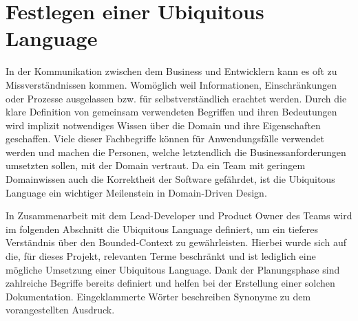 \section{Festlegen einer Ubiquitous Language}

In der Kommunikation zwischen dem Business und Entwicklern kann es oft zu Missverständnissen kommen. Womöglich weil Informationen, Einschränkungen oder Prozesse ausgelassen bzw. für selbstverständlich erachtet werden. Durch die klare Definition von gemeinsam verwendeten Begriffen und ihren Bedeutungen wird implizit notwendiges Wissen über die Domain und ihre Eigenschaften geschaffen. Viele dieser Fachbegriffe können für Anwendungsfälle verwendet werden und machen die Personen, welche letztendlich die Businessanforderungen umsetzten sollen, mit der Domain vertraut. Da ein Team mit geringem Domainwissen auch die Korrektheit der Software gefährdet, ist die Ubiquitous Language ein wichtiger Meilenstein in Domain-Driven Design. \cite[S. 335ff.]{Evans.2011}

In Zusammenarbeit mit dem Lead-Developer und \Gls{Product Owner} des Teams wird im folgenden Abschnitt die Ubiquitous Language definiert, um ein tieferes Verständnis über den Bounded-Context zu gewährleisten. Hierbei wurde sich auf die, für dieses Projekt, relevanten Terme beschränkt und ist lediglich eine mögliche Umsetzung einer Ubiquitous Language. Dank der Planungsphase sind zahlreiche Begriffe bereits definiert und helfen bei der Erstellung einer solchen Dokumentation. Eingeklammerte Wörter beschreiben Synonyme zu dem vorangestellten Ausdruck.

